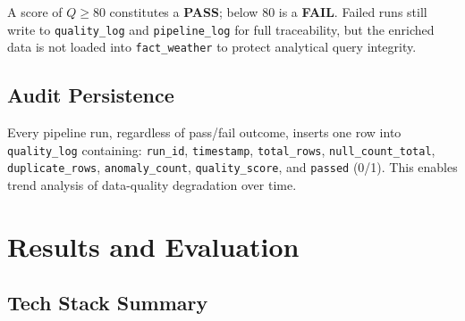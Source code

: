 \documentclass[12pt,a4paper]{report}
\begin{document}
A score of $Q \geq 80$ constitutes a \textbf{PASS}; below 80 is a \textbf{FAIL}. Failed runs still write to \texttt{quality\_log} and \texttt{pipeline\_log} for full traceability, but the enriched data is not loaded into \texttt{fact\_weather} to protect analytical query integrity.

\section{Audit Persistence}

Every pipeline run, regardless of pass/fail outcome, inserts one row into \texttt{quality\_log} containing: \texttt{run\_id}, \texttt{timestamp}, \texttt{total\_rows}, \texttt{null\_count\_total}, \texttt{duplicate\_rows}, \texttt{anomaly\_count}, \texttt{quality\_score}, and \texttt{passed} (0/1). This enables trend analysis of data-quality degradation over time.

\chapter{Results and Evaluation}

\section{Tech Stack Summary}
\end{document}
